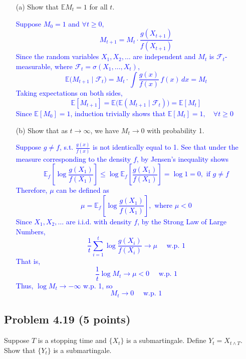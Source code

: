 \documentclass{article}
\begin{document}
\begin{enumerate}
    \item[(a)] Show that $\mathbb{E}M_t = 1$ for all $t$.

    \textcolor{blue}{Suppose $M_0 = 1$ and $\forall t \ge 0$, 
\[
M_{t+1} = M_t \cdot \frac{g(X_{t+1})}{f(X_{t+1})}
\]
Since the random variables $X_1, X_2, \ldots$ are independent and $M_t$ is $\mathcal{F}_t$-measurable, where $\mathcal{F}_t=\sigma(X_1,\ldots,X_t)$,
\[
\mathbb{E}\bigl(M_{t+1}\mid\mathcal{F}_t\bigr) 
= M_t \cdot \int \frac{g(x)}{f(x)}\, f(x) \,dx 
= M_t
\]
Taking expectations on both sides,
\[
\mathbb{E}[M_{t+1}] = \mathbb{E}\bigl(\mathbb{E}(M_{t+1}\mid\mathcal{F}_t)\bigr) = \mathbb{E}[M_t]
\]
Since $\mathbb{E}[M_0]=1$, induction trivially shows that 
$\mathbb{E}[M_t]=1, \quad \forall t\ge0$
}

    \item[(b)] Show that as $t \to \infty$, we have $M_t \to 0$ with probability 1.

    \textcolor{blue}{
        Suppose $g \neq f$, s.t. $\frac{g(x)}{f(x)}$ is not identically equal to 1. See that under the measure corresponding to the density $f$, by Jensen's inequality shows
\[
\mathbb{E}_f\!\left[\log\frac{g(X_1)}{f(X_1)}\right] 
\le \log\mathbb{E}_f\!\left[\frac{g(X_1)}{f(X_1)}\right] 
=\log 1 = 0, \text{ if } g \neq f 
\]
Therefore, $\mu$ can be defined as 
\[
    \mu = \mathbb{E}_f\!\left[\log\frac{g(X_1)}{f(X_1)}\right], \text{ where } \mu < 0
\]
Since $X_1, X_2, \ldots$ are i.i.d. with density $f$, by the Strong Law of Large Numbers,
\[
    \frac{1}{t}\sum_{i=1}^t \log\frac{g(X_i)}{f(X_i)} \to \mu \quad \text{ w.p. 1}
\]
That is,
\[
\frac{1}{t}\log M_t \to \mu < 0 \quad \text{ w.p. 1}
\]
Thus, $\log M_t \to -\infty$ w.p. 1, so
\[
M_t \to 0 \quad \text{ w.p. 1}
\]}

\end{enumerate}


\subsection*{Problem 4.19 (5 points)}
Suppose $T$ is a stopping time and $\{X_t\}$ is a submartingale. Define $Y_t = X_{t \wedge T}$. Show that $\{Y_t\}$ is a submartingale.
\end{document}
